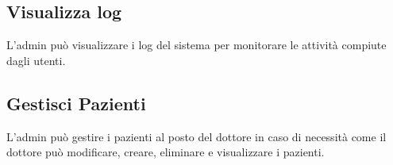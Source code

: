 \documentclass{report}
\begin{document}
\subsection{Visualizza log}
L'admin può visualizzare i log del sistema per monitorare le attività compiute
dagli utenti.

\vspace{0.5cm}

\newpage
\subsection{Gestisci Pazienti}
L'admin può gestire i pazienti al posto del dottore in caso di necessità
come il dottore può modificare, creare, eliminare e visualizzare i pazienti.

\vspace{0.5cm}
\end{document}
